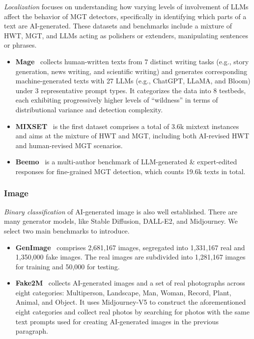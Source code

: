 \textit{Localization} focuses on understanding how varying levels of involvement of LLMs affect the behavior of MGT detectors, specifically in identifying which parts of a text are AI-generated. These datasets and benchmarks include a mixture of HWT, MGT, and LLMs acting as polishers or extenders, manipulating sentences or phrases.
\begin{itemize}
    \item \textbf{Mage}~\cite{li2024mage} collects human-written texts from 7 distinct writing tasks (e.g., story generation, news writing, and scientific writing) and generates corresponding machine-generated texts with 27 LLMs (e.g., ChatGPT, LLaMA, and Bloom) under 3 representative prompt types. It categorizes the data into 8 testbeds, each exhibiting progressively higher levels of “wildness” in terms of distributional variance and detection complexity.
    \item \textbf{MIXSET}~\cite{zhang2024llm}  is the first dataset comprises a total of 3.6k mixtext instances and aims at the mixture of HWT and MGT, including both AI-revised HWT and human-revised MGT scenarios. 
    \item \textbf{Beemo}~\cite{artemova2024beemo} is a multi-author benchmark of LLM-generated \& expert-edited responses for fine-grained MGT detection, which counts 19.6k texts in total.
\end{itemize}
\subsubsection{\textbf{Image}}
\textit{Binary classification} of AI-generated image is also well established. There are many generator models, like Stable Diffusion, DALL-E2, and Midjourney. We select two main benchmarks to introduce.
\begin{itemize}
    \item\textbf{GenImage}~\cite{zhu2024genimage} comprises 2,681,167 images, segregated into 1,331,167 real and 1,350,000 fake images. The real images are subdivided into 1,281,167 images for training and 50,000 for testing.
    \item \textbf{Fake2M}~\cite{lu2024seeing} collects AI-generated images and a set of real photographs across eight categories: Multiperson, Landscape, Man, Woman, Record, Plant, Animal, and Object. It uses Midjourney-V5 to construct the aforementioned eight categories and collect real photos by searching for photos with the same text prompts used for creating AI-generated images in the previous paragraph.
\end{itemize}

